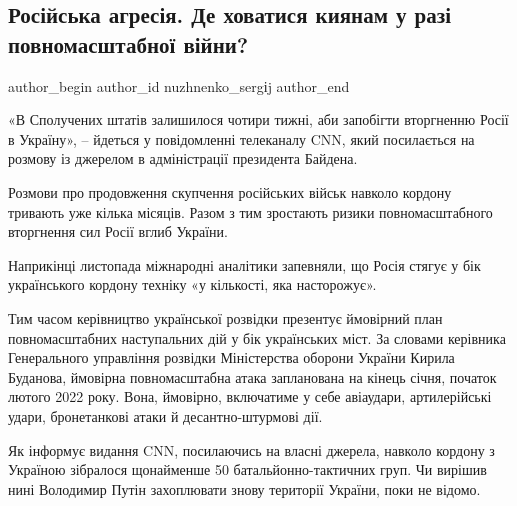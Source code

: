  
 
 
 
 
\subsection{Російська агресія. Де ховатися киянам у разі повномасштабної війни?}
\label{sec:20_12_2021.stz.news.ua.radiosvoboda.1.kievljane_ugroza_vojna}

\ifcmt
 author_begin
   author_id nuzhnenko_sergіj
 author_end
\fi

«В Сполучених штатів залишилося чотири тижні, аби запобігти вторгненню Росії в
Україну», – йдеться у повідомленні телеканалу CNN, який посилається на розмову
із джерелом в адміністрації президента Байдена.

Розмови про продовження скупчення російських військ навколо кордону тривають
уже кілька місяців. Разом з тим зростають ризики повномасштабного вторгнення
сил Росії вглиб України. 

Наприкінці листопада міжнародні аналітики запевняли, що Росія стягує у бік
українського кордону техніку «у кількості, яка насторожує».


Тим часом керівництво української розвідки презентує ймовірний план
повномасштабних наступальних дій у бік українських міст. За словами керівника
Генерального управління розвідки Міністерства оборони України Кирила Буданова,
ймовірна повномасштабна атака запланована на кінець січня, початок лютого 2022
року. Вона, ймовірно, включатиме у себе авіаудари, артилерійські удари,
бронетанкові атаки й десантно-штурмові дії.

Як інформує видання CNN, посилаючись на власні джерела, навколо кордону з
Україною зібралося щонайменше 50 батальйонно-тактичних груп. Чи вирішив нині
Володимир Путін захоплювати знову території України, поки не відомо.

